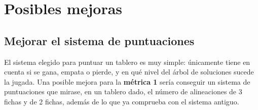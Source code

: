 \documentclass[11pt]{article}
\begin{document}
\section{Posibles mejoras}
\label{sec-3}

\subsection{Mejorar el sistema de puntuaciones}
\label{sec-3-1}

El sistema elegido para puntuar un tablero es muy simple: únicamente tiene en cuenta si se gana, empata o pierde, y en qué nivel del árbol de soluciones sucede la jugada. Una posible mejora para la \textbf{\textbf{métrica 1}} sería conseguir un sistema de puntuaciones que mirase, en un tablero dado, el número de alineaciones de 3 fichas y de 2 fichas, además de lo que ya comprueba con el sistema antiguo. 
\end{document}
